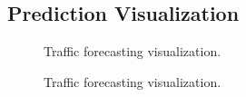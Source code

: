 \documentclass{article}
\begin{document}
\subsection{Prediction Visualization}
\begin{figure}[h]
\centering
{}
\caption{Traffic forecasting visualization.}
\label{visualization1} 
\end{figure}

\begin{figure}[h]
\centering
{}
\caption{Traffic forecasting visualization.}
\label{visualization2} 
\end{figure}


\begin{comment}
\section{Graph Convolutional Network}
Our work is based on the widely-used spectral Graph Convolutional Network \cite{gcn-defferrard,kipf-gcn}, which is formulated in the Fourier domain. In this part, we introduce the knowledge about  Chebyshev polynomial approximation of GCN that we mentioned in Eq. \ref{gcn_formulation} and Section \ref{model_analysis}.
\end{comment}
\end{document}
